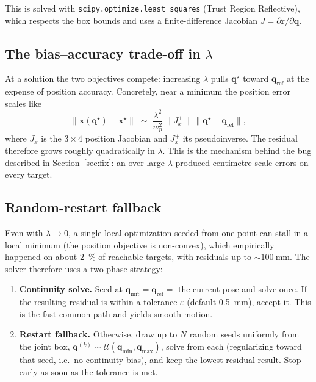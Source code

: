 \documentclass[11pt]{article}
\begin{document}
This is solved with \texttt{scipy.optimize.least\_squares} (Trust Region
Reflective), which respects the box bounds and uses a finite-difference
Jacobian $J=\partial\bm{r}/\partial\bm{q}$.

\subsection{The bias--accuracy trade-off in \texorpdfstring{$\lambda$}{lambda}}

At a solution the two objectives compete: increasing $\lambda$ pulls
$\bm{q}^\star$ toward $\bm{q}_{\text{ref}}$ at the expense of position
accuracy. Concretely, near a minimum the position error scales like
\begin{equation}
\lVert \bm{x}(\bm{q}^\star)-\bm{x}^\star\rVert
   \;\sim\; \frac{\lambda^2}{w_p^2}\,\lVert J_x^{+}\rVert\,
            \lVert \bm{q}^\star-\bm{q}_{\text{ref}}\rVert,
\end{equation}
where $J_x$ is the $3\times4$ position Jacobian and $J_x^{+}$ its pseudoinverse.
The residual therefore grows roughly quadratically in $\lambda$. This is the
mechanism behind the bug described in Section~\ref{sec:fix}: an
over-large $\lambda$ produced centimetre-scale errors on every target.

\subsection{Random-restart fallback}

Even with $\lambda\to 0$, a single local optimization seeded from one point
can stall in a local minimum (the position objective is non-convex), which
empirically happened on about \SI{2}{\percent} of reachable targets, with
residuals up to $\sim\SI{100}{\milli\meter}$. The solver therefore uses a
two-phase strategy:

\begin{enumerate}[leftmargin=2em]
  \item \textbf{Continuity solve.} Seed at $\bm{q}_{\text{init}}=\bm{q}_{\text{ref}}=$
        the current pose and solve once. If the resulting residual is within
        a tolerance $\varepsilon$ (default \SI{0.5}{\milli\meter}), accept it.
        This is the fast common path and yields smooth motion.
  \item \textbf{Restart fallback.} Otherwise, draw up to $N$ random seeds
        uniformly from the joint box,
        $\bm{q}^{(k)}\sim\mathcal{U}(\bm{q}_{\min},\bm{q}_{\max})$, solve from
        each (regularizing toward that seed, i.e.\ no continuity bias), and
        keep the lowest-residual result. Stop early as soon as the tolerance
        is met.
\end{enumerate}
\end{document}
